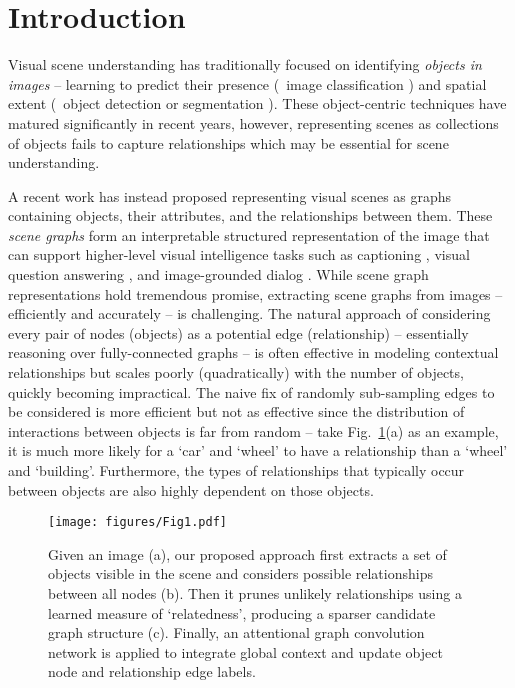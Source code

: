 \section{Introduction}
Visual scene understanding has traditionally focused on identifying \emph{objects in images} -- learning to predict their presence (\ie~image classification \cite{krizhevsky2012imagenet, szegedy2015going, he2016deep}) and spatial extent (\ie~object detection \cite{girshick2014rich, redmon2016you, liu2016ssd} or segmentation \cite{lin2017feature}). These object-centric techniques have matured significantly in recent years, however, representing scenes as collections of objects fails to capture relationships which may be essential for scene understanding.

A recent work \cite{Johnson2015CVPR} has instead proposed representing visual scenes as graphs containing objects, their attributes, and the relationships between them. These \emph{scene graphs} form an interpretable structured representation of the image that can support higher-level visual intelligence tasks such as captioning \cite{wu2017image, Lu2018Neural}, visual question answering \cite{antol2015vqa, teney2016graph, wu2017image, wang2017vqa, wang2017fvqa, johnson2017clevr}, and image-grounded dialog \cite{das2016visual}. While scene graph representations hold tremendous promise, extracting scene graphs from images -- efficiently and accurately -- is challenging. The natural approach of considering every pair of nodes (objects) as a potential edge (relationship) -- essentially reasoning over fully-connected graphs -- is often effective in modeling contextual relationships but scales poorly (quadratically) with the number of objects, quickly becoming impractical. 
The naive fix of randomly sub-sampling edges to be considered is more efficient but not as effective since the distribution of interactions between objects is far from random -- take Fig.~\ref{fig:teaser}(a) as an example, it is much more likely for a `car' and `wheel' to have a relationship than a `wheel' and `building'. Furthermore, the types of relationships that typically occur between objects are also highly dependent on those objects. 

\begin{figure}[t]
  \begin{center}
    \texttt{[image: figures/Fig1.pdf]}
  \end{center}
\caption{Given an image (a), our proposed approach first extracts a set of objects visible in the scene and considers possible relationships between all nodes (b). Then it prunes unlikely relationships using a learned measure of `relatedness', producing a sparser candidate graph structure (c). Finally, an attentional graph convolution network is applied to integrate global context and update object node and relationship edge labels.}
\label{fig:teaser}
\end{figure}

